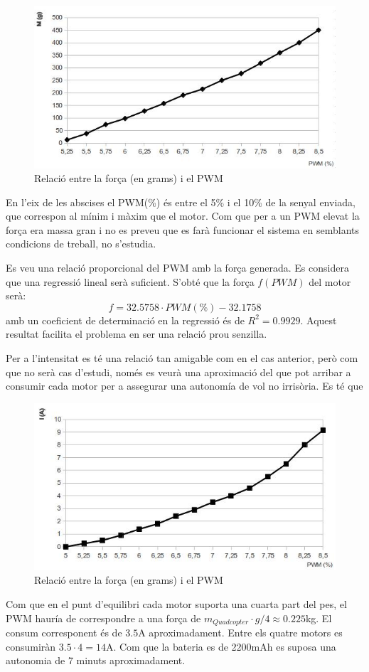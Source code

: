 \documentclass[twoside]{article}
\begin{document}
\begin{figure}[h!]
\begin{center}
\includegraphics[scale=0.8]{images/MvsPWM.jpeg}
\caption{Relació entre la força (en grams) i el PWM}
\end{center}
\end{figure}
En l'eix de les abscises el PWM(\%) és entre el 5\% i el 10\% de la senyal enviada, que correspon al mínim i màxim que el motor. Com que per a un PWM elevat la força era massa gran i no es preveu que es farà funcionar el sistema en semblants condicions de treball, no s'estudia. 

Es veu una relació proporcional del PWM amb la força generada. Es considera que una regressió lineal serà suficient. S'obté que la força $f(PWM)$ del motor serà:
$$f=32.5758 \cdot PWM(\%)-32.1758$$
amb un coeficient de determinació en la regressió és de  $R^2=0.9929$. Aquest resultat facilita el problema en ser una relació prou senzilla.

Per a l'intensitat es té una relació tan amigable com en el cas anterior, però com que no serà cas d'estudi, només es veurà una aproximació del que pot arribar a consumir cada motor per a assegurar una autonomía de vol no irrisòria. Es té que 
\newpage
\begin{figure}[!h]
\begin{center}
\includegraphics[scale=0.8]{images/IvsPWM.jpeg}
\caption{Relació entre la força (en grams) i el PWM}
\end{center}
\end{figure}

Com que en el punt d'equilibri cada motor suporta una cuarta part del pes, el PWM hauría de correspondre a una força de $m_{Quadcopter}\cdot g/4\approx0.225$kg. El consum corresponent és de $3.5$A aproximadament. Entre els quatre motors es consumiràn $3.5 \cdot 4=14$A. Com que la bateria es de 2200mAh es suposa una autonomia de 7 minuts aproximadament. 
\end{document}

